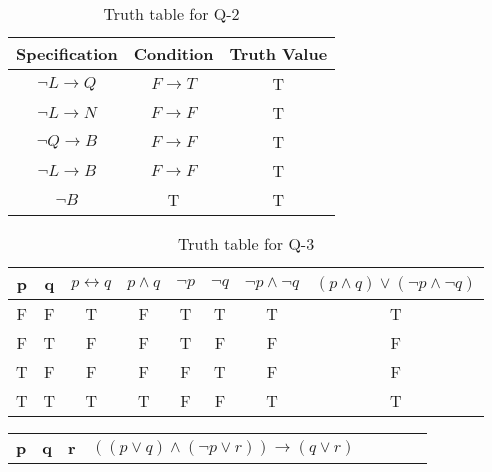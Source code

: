 \documentclass{article}
\begin{document}
\begin{enumerate}
\begin{table} [H]
                \begin{tabular}{ | c | c | c | }
                \hline
                \textbf{Specification} & \textbf{Condition} & \textbf{Truth Value} \\ [0.5 ex]
                \hline 
                $ \neg L \rightarrow Q$ & $F \rightarrow T$ & T \\
                \hline
                $ \neg L \rightarrow N$ & $F \rightarrow F$ & T \\
                \hline
                $ \neg Q \rightarrow B$ & $F \rightarrow F$ & T \\
                \hline
                $ \neg L \rightarrow B$ & $F \rightarrow F$ & T \\
                \hline
                $ \neg B $ & T & T \\ [1ex]
                \hline
                \end{tabular}
                \caption{Truth table for Q-2}
                \label {table:3}
        \end{table}
        \begin{table} [H]
                \centering
                \begin{tabular}{ | c | c | c | c | c | c | c | c | }
                \hline
                \textbf{p} & \textbf{q} & \textbf{$p \leftrightarrow q$} & \textbf{$p \wedge q$} & \textbf{$ \neg p$} & \textbf{$ \neg q$} & \textbf{$ \neg p \wedge \neg q$} & \textbf{$(p \wedge q) \vee (\neg p \wedge \neg q)$} \\ [0.5 ex]
                \hline 
                F & F & T & F & T & T & T & T \\
                \hline
                F & T & F & F & T & F & F & F \\
                \hline
                T & F & F & F & F & T & F & F \\
                \hline
                T & T & T & T & F & F & T & T \\ [1ex]
                \hline
                \end{tabular}
                \caption{Truth table for Q-3}
                \label {table:4}
        \end{table}
        \begin{table} [H]
                \centering
                \begin{tabular}{ | c | c | c | c | c | c | c | c | }
                \hline
                \textbf{p} & \textbf{q} & \textbf{r} & \textbf{$((p \vee q) \wedge (\neg p \vee r)) \rightarrow (q \vee r)$} \\ [0.5 ex]

\end{tabular}
\end{table}
\end{enumerate}
\end{document}

